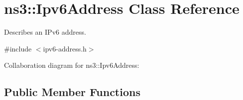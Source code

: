 \hypertarget{classns3_1_1Ipv6Address}{}\section{ns3\+:\+:Ipv6\+Address Class Reference}
\label{classns3_1_1Ipv6Address}


Describes an I\+Pv6 address.  




{\ttfamily \#include $<$ipv6-\/address.\+h$>$}



Collaboration diagram for ns3\+:\+:Ipv6\+Address\+:
\subsection*{Public Member Functions}
